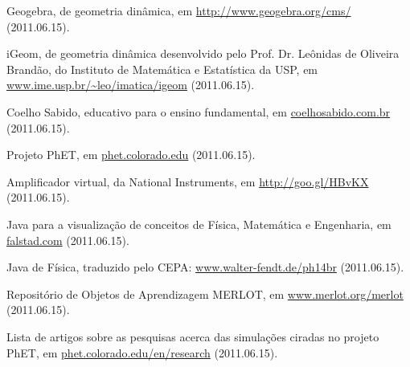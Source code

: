 \begin{thebibliography}{+++}
	 Geogebra,  de geometria dinâmica, em \url{http://www.geogebra.org/cms/} (2011.06.15).
	
	 iGeom,  de geometria dinâmica desenvolvido pelo Prof. Dr. Leônidas de Oliveira Brandão, do Instituto de Matemática e Estatística da USP, em \url{www.ime.usp.br/~leo/imatica/igeom} (2011.06.15).
		
	 Coelho Sabido,  educativo para o ensino fundamental, em \url{coelhosabido.com.br} (2011.06.15).
	
	 Projeto PhET, em \url{phet.colorado.edu} (2011.06.15).
	
	 Amplificador  virtual, da National Instruments, em \url{http://goo.gl/HBvKX} (2011.06.15).
	
	  Java para a visualização de conceitos de Física, Matemática e Engenharia, em \url{falstad.com} (2011.06.15).
	
	  Java de Física, traduzido pelo CEPA: \url{www.walter-fendt.de/ph14br} (2011.06.15).	
	
	 Repositório de Objetos de Aprendizagem MERLOT, em \url{www.merlot.org/merlot} (2011.06.15).
	
	 Lista de artigos sobre as pesquisas acerca das simulações ciradas no projeto PhET\cite{phet}, em \url{phet.colorado.edu/en/research} (2011.06.15).
	
\end{thebibliography}